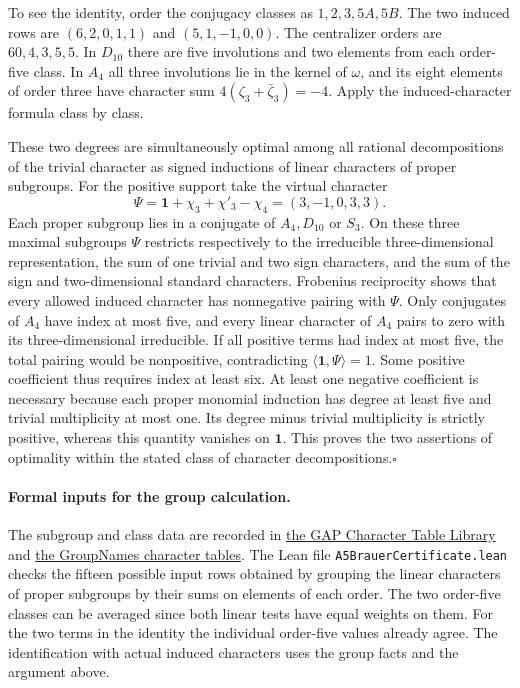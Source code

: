 \documentclass[11pt]{article}
\begin{document}
To see the identity, order the conjugacy classes as $1,2,3,5A,5B$. The two induced rows are $(6,2,0,1,1)$ and $(5,1,-1,0,0)$. The centralizer orders are $60,4,3,5,5$. In $D_{10}$ there are five involutions and two elements from each order-five class. In $A_4$ all three involutions lie in the kernel of $\omega$, and its eight elements of order three have character sum $4(\zeta_3+\bar\zeta_3)=-4$. Apply the induced-character formula class by class.

These two degrees are simultaneously optimal among all rational decompositions of the trivial character as signed inductions of linear characters of proper subgroups. For the positive support take the virtual character
\[
 \Psi=\mathbf1+\chi_3+\chi'_3-\chi_4=(3,-1,0,3,3).
\]
Each proper subgroup lies in a conjugate of $A_4,D_{10}$ or $S_3$. On these three maximal subgroups $\Psi$ restricts respectively to the irreducible three-dimensional representation, the sum of one trivial and two sign characters, and the sum of the sign and two-dimensional standard characters. Frobenius reciprocity shows that every allowed induced character has nonnegative pairing with $\Psi$. Only conjugates of $A_4$ have index at most five, and every linear character of $A_4$ pairs to zero with its three-dimensional irreducible. If all positive terms had index at most five, the total pairing would be nonpositive, contradicting $\langle\mathbf1,\Psi\rangle=1$. Some positive coefficient thus requires index at least six. At least one negative coefficient is necessary because each proper monomial induction has degree at least five and trivial multiplicity at most one. Its degree minus trivial multiplicity is strictly positive, whereas this quantity vanishes on $\mathbf1$. This proves the two assertions of optimality within the stated class of character decompositions.\hfill$\square$

\paragraph{Formal inputs for the group calculation.}
The subgroup and class data are recorded in \href{https://www.math.rwth-aachen.de/~Thomas.Breuer/ctbllib/ctbltoc/data/A5.html}{the GAP Character Table Library} and \href{https://people.maths.bris.ac.uk/~matyd/GroupNames/characters.html}{the GroupNames character tables}. The Lean file \texttt{A5BrauerCertificate.lean} checks the fifteen possible input rows obtained by grouping the linear characters of proper subgroups by their sums on elements of each order. The two order-five classes can be averaged since both linear tests have equal weights on them. For the two terms in the identity the individual order-five values already agree. The identification with actual induced characters uses the group facts and the argument above.
\end{document}
